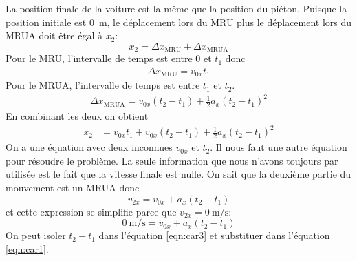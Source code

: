 \documentclass{tufte-handout}
\begin{document}
\begin{enumerate}[a]
    \begin{marginfigure}
    \end{marginfigure}

    La position finale de la voiture est la même que la position du piéton.
    Puisque la position initiale est \SI{0}{\meter}, le déplacement lors du MRU
    plus le déplacement lors du MRUA doit être égal à $x_2$:
    \[
      x_2 = \Delta x_\mathrm{MRU} + \Delta x_\mathrm{MRUA}
    \]
    Pour le MRU, l'intervalle de temps est entre $0$ et $t_1$ donc
    \begin{align*}
      \Delta x_\mathrm{MRU} = v_{0x} t_1
    \end{align*}
    Pour le MRUA, l'intervalle de temps est entre $t_1$ et $t_2$.
    \begin{align*}
      \Delta x_\mathrm{MRUA} = v_{0x} (t_2 - t_1) + \frac{1}{2} a_x (t_2 -
                               t_1)^2
    \end{align*}
    En combinant les deux on obtient
    \begin{align}
      x_2 &= v_{0x} t_1 + v_{0x} (t_2 - t_1) + \frac{1}{2} a_x (t_2 -
                               t_1)^2 \label{eqn:car1}
    \end{align}
    On a une équation avec deux inconnues $v_{0x}$ et $t_2$.  Il nous faut une
    autre équation pour résoudre le problème.  La seule information que nous
    n'avons toujours par utilisée est le fait que la vitesse finale est nulle.
    On sait que la deuxième partie du mouvement est un MRUA donc
    \begin{equation}
      v_{2x} = v_{0x} + a_x (t_2 - t_1)
      \label{eqn:car2}
    \end{equation}
    et cette expression se simplifie parce que $v_{2x} =
    \SI{0}{\meter\per\second}$:
    \begin{equation}
      \SI{0}{\meter\per\second} = v_{0x} + a_x (t_2 - t_1)
      \label{eqn:car3}
    \end{equation}
    On peut isoler $t_2 - t_1$ dans l'équation \ref{eqn:car3} et substituer dans
    l'équation \ref{eqn:car1}.
    \begin{align*}

\end{align*}
\end{enumerate}
\end{document}

